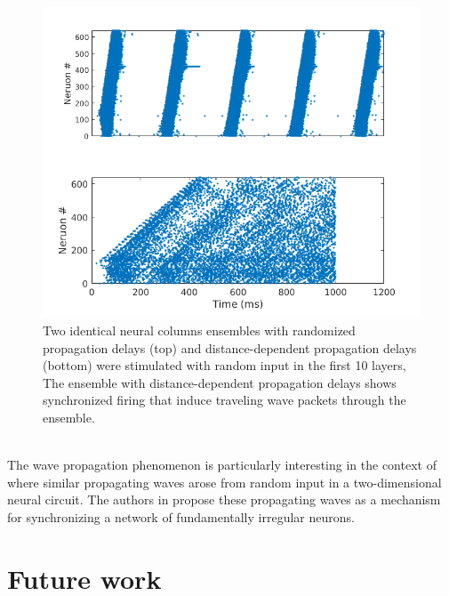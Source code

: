 \documentclass[a4paper,11pt]{article}
\begin{document}
\begin{figure}[ht]
 \caption{Two identical neural columns ensembles with randomized propagation delays (top) and distance-dependent propagation delays (bottom) were stimulated with random input in the first 10 layers,
 The ensemble with distance-dependent propagation delays shows synchronized firing that induce traveling wave packets through the ensemble.}
 \label{fig:delaycompare_column}
 \centering
   \includegraphics[width=\textwidth]{fig/DelayCompare_ColumnEnsemble}
\end{figure}
\\
The wave propagation phenomenon is particularly interesting in the context of \cite{keane2015} where similar propagating waves arose from random input in a two-dimensional neural circuit.
The authors in \cite{keane2015} propose these propagating waves as a mechanism for synchronizing a network of fundamentally irregular neurons. 

\section{Future work}


\clearpage
\printbibliography
\end{document}

